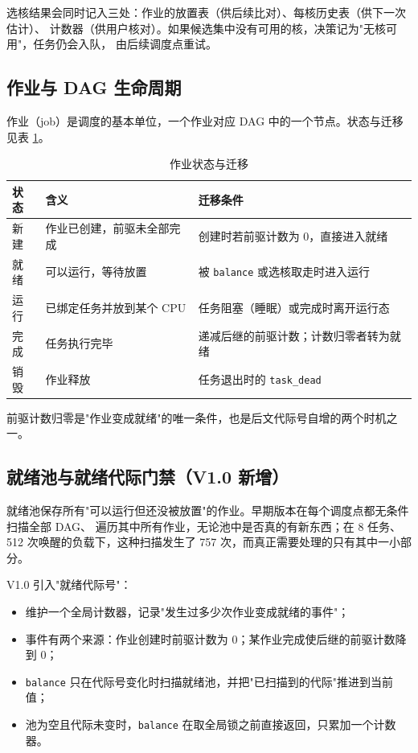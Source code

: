 \documentclass[11pt,a4paper]{article}
\newcommand{\code}[1]{\texttt{#1}}
\begin{document}
选核结果会同时记入三处：作业的放置表（供后续比对）、每核历史表（供下一次估计）、
计数器（供用户核对）。如果候选集中没有可用的核，决策记为"无核可用"，任务仍会入队，
由后续调度点重试。

\subsection{作业与 DAG 生命周期}

作业（job）是调度的基本单位，一个作业对应 DAG 中的一个节点。状态与迁移见表 \ref{tab:states}。

\begin{table}[H]
\centering
\caption{作业状态与迁移}
\label{tab:states}
\small
\begin{tabular}{@{}p{2.6cm}p{5.0cm}p{6.8cm}@{}}
\toprule
状态 & 含义 & 迁移条件 \\
\midrule
新建 & 作业已创建，前驱未全部完成 & 创建时若前驱计数为 0，直接进入就绪 \\
就绪 & 可以运行，等待放置 & 被 \code{balance} 或选核取走时进入运行 \\
运行 & 已绑定任务并放到某个 CPU & 任务阻塞（睡眠）或完成时离开运行态 \\
完成 & 任务执行完毕 & 递减后继的前驱计数；计数归零者转为就绪 \\
销毁 & 作业释放 & 任务退出时的 \code{task\_dead} \\
\bottomrule
\end{tabular}
\end{table}

前驱计数归零是"作业变成就绪"的唯一条件，也是后文代际号自增的两个时机之一。

\subsection{就绪池与就绪代际门禁（V1.0 新增）}

就绪池保存所有"可以运行但还没被放置"的作业。早期版本在每个调度点都无条件扫描全部 DAG、
遍历其中所有作业，无论池中是否真的有新东西；在 8 任务、512 次唤醒的负载下，这种扫描发生了
757 次，而真正需要处理的只有其中一小部分。

V1.0 引入"就绪代际号"：

\begin{itemize}
  \item 维护一个全局计数器，记录"发生过多少次作业变成就绪的事件"；
  \item 事件有两个来源：作业创建时前驱计数为 0；某作业完成使后继的前驱计数降到 0；
  \item \code{balance} 只在代际号变化时扫描就绪池，并把"已扫描到的代际"推进到当前值；
  \item 池为空且代际未变时，\code{balance} 在取全局锁之前直接返回，只累加一个计数器。
\end{itemize}
\end{document}
